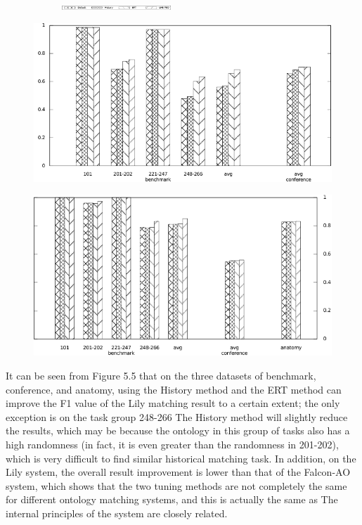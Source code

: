\documentclass[twoside]{article}
\begin{document}
\begin{figure}[htb!]\centering
\begin{subfigure}{\textwidth}
	\centering
	\includegraphics[width=0.45\textwidth]{figures/legend.pdf}
\end{subfigure}
\begin{minipage}{0.49\textwidth}
	\centering
	\includegraphics[width=\textwidth]{data_figs/GMap_F1-Measure.pdf}
	\label{fig:GMap_F1-Measure}
\end{minipage}
\begin{minipage}{0.49\textwidth}
	\centering
	\includegraphics[width=\textwidth]{data_figs/Lily_F1-Measure.pdf}
	\label{fig:Lily_F1-Measure}
\end{minipage}
\end{figure}


It can be seen from Figure 5.5 that on the three datasets of benchmark, conference, and anatomy, using the History method and the ERT method can improve the F1 value of the Lily matching result to a certain extent; the only exception is on the task group 248-266 The History method will slightly reduce the results, which may be because the ontology in this group of tasks also has a high randomness (in fact, it is even greater than the randomness in 201-202), which is very difficult to find similar historical matching task.
In addition, on the Lily system, the overall result improvement is lower than that of the Falcon-AO system, which shows that the two tuning methods are not completely the same for different ontology matching systems, and this is actually the same as The internal principles of the system are closely related.
\end{document}

